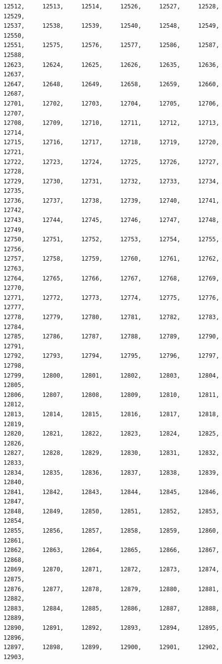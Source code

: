 \documentclass[a4paper,11pt]{report}
\begin{document}
\begin{verbatim}
12512,     12513,     12514,     12526,     12527,     12528,     12529,     
12537,     12538,     12539,     12540,     12548,     12549,     12550,     
12551,     12575,     12576,     12577,     12586,     12587,     12588,     
12623,     12624,     12625,     12626,     12635,     12636,     12637,     
12647,     12648,     12649,     12658,     12659,     12660,     12687,     
12701,     12702,     12703,     12704,     12705,     12706,     12707,     
12708,     12709,     12710,     12711,     12712,     12713,     12714,     
12715,     12716,     12717,     12718,     12719,     12720,     12721,     
12722,     12723,     12724,     12725,     12726,     12727,     12728,     
12729,     12730,     12731,     12732,     12733,     12734,     12735,     
12736,     12737,     12738,     12739,     12740,     12741,     12742,     
12743,     12744,     12745,     12746,     12747,     12748,     12749,     
12750,     12751,     12752,     12753,     12754,     12755,     12756,     
12757,     12758,     12759,     12760,     12761,     12762,     12763,     
12764,     12765,     12766,     12767,     12768,     12769,     12770,     
12771,     12772,     12773,     12774,     12775,     12776,     12777,     
12778,     12779,     12780,     12781,     12782,     12783,     12784,     
12785,     12786,     12787,     12788,     12789,     12790,     12791,     
12792,     12793,     12794,     12795,     12796,     12797,     12798,     
12799,     12800,     12801,     12802,     12803,     12804,     12805,     
12806,     12807,     12808,     12809,     12810,     12811,     12812,     
12813,     12814,     12815,     12816,     12817,     12818,     12819,     
12820,     12821,     12822,     12823,     12824,     12825,     12826,     
12827,     12828,     12829,     12830,     12831,     12832,     12833,     
12834,     12835,     12836,     12837,     12838,     12839,     12840,     
12841,     12842,     12843,     12844,     12845,     12846,     12847,     
12848,     12849,     12850,     12851,     12852,     12853,     12854,     
12855,     12856,     12857,     12858,     12859,     12860,     12861,     
12862,     12863,     12864,     12865,     12866,     12867,     12868,     
12869,     12870,     12871,     12872,     12873,     12874,     12875,     
12876,     12877,     12878,     12879,     12880,     12881,     12882,     
12883,     12884,     12885,     12886,     12887,     12888,     12889,     
12890,     12891,     12892,     12893,     12894,     12895,     12896,     
12897,     12898,     12899,     12900,     12901,     12902,     12903,     

\end{verbatim}
\end{document}
